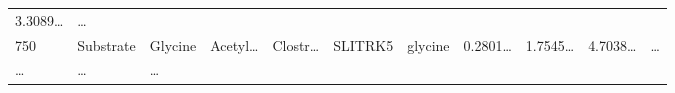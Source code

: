 \documentclass[
]{article}
\begin{document}
\begin{longtable}[]{@{}lllllllllll@{}}
\begin{minipage}[t]{0.07\columnwidth}
3.3089\ldots{}\strut
\end{minipage} & \begin{minipage}[t]{0.03\columnwidth}\raggedright
\ldots{}\strut
\end{minipage}\tabularnewline
\begin{minipage}[t]{0.03\columnwidth}\raggedright
750\strut
\end{minipage} & \begin{minipage}[t]{0.07\columnwidth}\raggedright
Substrate\strut
\end{minipage} & \begin{minipage}[t]{0.07\columnwidth}\raggedright
Glycine\strut
\end{minipage} & \begin{minipage}[t]{0.09\columnwidth}\raggedright
Acetyl\ldots{}\strut
\end{minipage} & \begin{minipage}[t]{0.07\columnwidth}\raggedright
Clostr\ldots{}\strut
\end{minipage} & \begin{minipage}[t]{0.07\columnwidth}\raggedright
SLITRK5\strut
\end{minipage} & \begin{minipage}[t]{0.09\columnwidth}\raggedright
glycine\strut
\end{minipage} & \begin{minipage}[t]{0.07\columnwidth}\raggedright
0.2801\ldots{}\strut
\end{minipage} & \begin{minipage}[t]{0.07\columnwidth}\raggedright
1.7545\ldots{}\strut
\end{minipage} & \begin{minipage}[t]{0.07\columnwidth}\raggedright
4.7038\ldots{}\strut
\end{minipage} & \begin{minipage}[t]{0.03\columnwidth}\raggedright
\ldots{}\strut
\end{minipage}\tabularnewline
\begin{minipage}[t]{0.03\columnwidth}\raggedright
\ldots{}\strut
\end{minipage} & \begin{minipage}[t]{0.07\columnwidth}\raggedright
\ldots{}\strut
\end{minipage} & \begin{minipage}[t]{0.07\columnwidth}\raggedright
\ldots{}\strut
\end{minipage} & \begin{minipage}[t]{0.09\columnwidth}\raggedright

\end{minipage}
\end{longtable}
\end{document}
